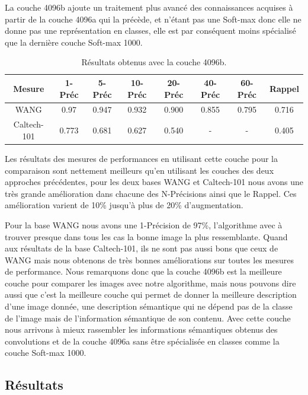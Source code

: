 	La couche 4096b ajoute un traitement plus avancé des connaissances acquises à partir de la couche 4096a qui la précède, et n'étant pas une Soft-max donc elle ne donne pas une représentation en classes, elle est par conséquent moins spécialisé que la dernière couche Soft-max 1000.


\begin{table}[H]
\begin{center}
\begin{tabular}{|c|c|c|c|c|c|c|c|}
\hline
	Mesure & 1-Préc & 5-Préc & 10-Préc & 20-Préc & 40-Préc & 60-Préc & Rappel\\
\hline
	WANG & 0.97 & 0.947 & 0.932 & 0.900 & 0.855 & 0.795 & 0.716\\
\hline
	Caltech-101 & 0.773 & 0.681 & 0.627 & 0.540 & - & - & 0.405\\
\hline
\end{tabular}
\end{center}
\caption{Résultats obtenus avec la couche 4096b.}
\end{table}

	Les résultats des mesures de performances en utilisant cette couche pour la comparaison sont nettement meilleurs qu'en utilisant les couches des deux approches précédentes, pour les deux bases WANG et Caltech-101 nous avons une très grande amélioration dans chacune des N-Précisions ainsi que le Rappel. Ces amélioration varient de 10\% jusqu'à plus de 20\% d'augmentation.
	
	Pour la base WANG nous avons une 1-Précision de 97\%, l'algorithme avec à trouver presque dans tous les cas la bonne image la plus ressemblante. Quand aux résultats de la base Caltech-101, ils ne sont pas aussi bons que ceux de WANG mais nous obtenons de très bonnes améliorations sur toutes les mesures de performance. 
	Nous remarquons donc que la couche 4096b est la meilleure couche pour comparer les images avec notre algorithme, mais nous pouvons dire aussi que c'est la meilleure couche qui permet de donner la meilleure description d'une image donnée, une description sémantique qui ne dépend pas de la classe de l'image mais de l'information sémantique de son contenu. Avec cette couche nous arrivons à mieux rassembler les informations sémantiques obtenus des convolutions et de la couche 4096a sans être spécialisée en classes comme la couche Soft-max 1000.
	
\subsection{Résultats}

